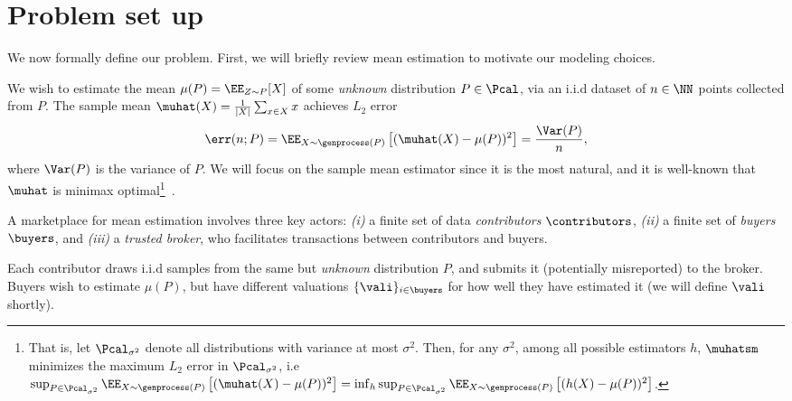\section{Problem set up}

We now formally define our problem. 
First, we will briefly review mean estimation to motivate our modeling choices.

We wish to estimate the mean $\mu(P) = \EE_{Z\sim P}[X]$ of some \emph{unknown} distribution $P\in\Pcal$, via 
an i.i.d dataset of $n\in\NN$ points collected from $P$.
The sample mean $\muhat(X) = \frac{1}{|X|}\sum_{x \in X} x$ achieves 
$L_2$ error
\begin{align}
    \label{eqn:err}
    \err(n; P) = %
         \EE_{X\sim \genprocess(P)}\left[
        (\muhat(X) - \mu(P))^2
    \right]      
    = \frac{\Var(P)}{n},
\end{align}
where $\Var(P)$ is the variance of $P$.
We will focus on the sample mean estimator since it is the most natural, 
and it is well-known that $\muhat$ is minimax optimal\footnote{%
That is, let $\Pcal_{\sigma^2}$ denote all distributions with variance at most $\sigma^2$.
Then, for any $\sigma^2$, among all possible estimators $h$, $\muhatsm$ minimizes the maximum
$L_2$ error in $\Pcal_{\sigma^2}$,
i.e
$\sup_{P\in\Pcal_{\sigma^2}} \EE_{X\sim \genprocess(P)}\left[
        (\muhat(X) - \mu(P))^2
    \right]
    = \inf_{h} \sup_{P\in\Pcal_{\sigma^2}} \EE_{X\sim \genprocess(P)}\left[
        (h(X) - \mu(P))^2
    \right]$.
}~\citep{stein1956inadmissibility}.



A marketplace for mean estimation involves three key actors:  
\emph{(i)} a finite set of data \emph{contributors} $\contributors$,
\emph{(ii)} a finite set of \emph{buyers} $\buyers$,
and
\emph{(iii)} a \emph{trusted broker}, who facilitates transactions between contributors and buyers.  


Each contributor draws i.i.d samples from the same but \emph{unknown} distribution $P$, and submits it (potentially misreported) to the broker.
Buyers wish to estimate $\mu(P)$, but have different valuations $\{\vali\}_{i\in\buyers}$ for how well they have estimated it (we will define $\vali$ shortly).




